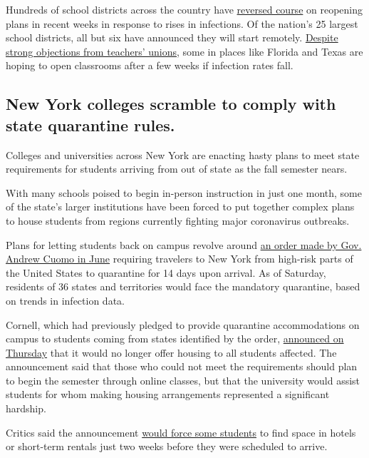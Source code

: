 Hundreds of school districts across the country have
\href{https://www.nytimes.com/2020/07/13/us/lausd-san-diego-school-reopening.html}{reversed
course} on reopening plans in recent weeks in response to rises in
infections. Of the nation's 25 largest school districts, all but six
have announced they will start remotely.
\href{https://www.nytimes.com/2020/07/29/us/teacher-union-school-reopening-coronavirus.html}{Despite
strong objections from teachers' unions}, some in places like Florida
and Texas are hoping to open classrooms after a few weeks if infection
rates fall.

\hypertarget{new-york-colleges-scramble-to-comply-with-state-quarantine-rules}{%
\subsection{New York colleges scramble to comply with state quarantine
rules.}\label{new-york-colleges-scramble-to-comply-with-state-quarantine-rules}}

Colleges and universities across New York are enacting hasty plans to
meet state requirements for students arriving from out of state as the
fall semester nears.

With many schools poised to begin in-person instruction in just one
month, some of the state's larger institutions have been forced to put
together complex plans to house students from regions currently fighting
major coronavirus outbreaks.

Plans for letting students back on campus revolve around
\href{https://www.nytimes.com/2020/06/24/nyregion/ny-coronavirus-states-quarantine.html}{an
order made by Gov. Andrew Cuomo in June} requiring travelers to New York
from high-risk parts of the United States to quarantine for 14 days upon
arrival. As of Saturday, residents of 36 states and territories would
face the mandatory quarantine, based on trends in infection data.

Cornell, which had previously pledged to provide quarantine
accommodations on campus to students coming from states identified by
the order,
\href{https://covid.cornell.edu/updates/20200730-important-updates.cfm}{announced
on Thursday} that it would no longer offer housing to all students
affected. The announcement said that those who could not meet the
requirements should plan to begin the semester through online classes,
but that the university would assist students for whom making housing
arrangements represented a significant hardship.

Critics said the announcement
\href{https://cornellsun.com/2020/07/31/editorial-cornells-inability-to-quarantine-arriving-students-should-concern-you/}{would
force some students} to find space in hotels or short-term rentals just
two weeks before they were scheduled to arrive.

